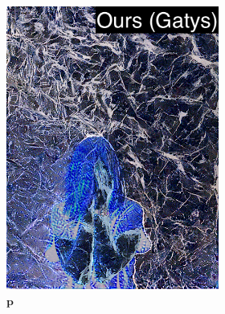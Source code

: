 \begin{figure}[]
\begin{subfigure}{\textwidth}
\begin{subfigure}{0.24\textwidth}
            \includegraphics[width=\textwidth]{images/04-experiment02/human/marble/gatys_im_label.jpg}
            \caption*{\(\bm{p}\)}
        \end{subfigure}
        \hfill
        \begin{subfigure}{0.24\textwidth}
            \centering

\end{subfigure}
\end{subfigure}
\end{figure}
